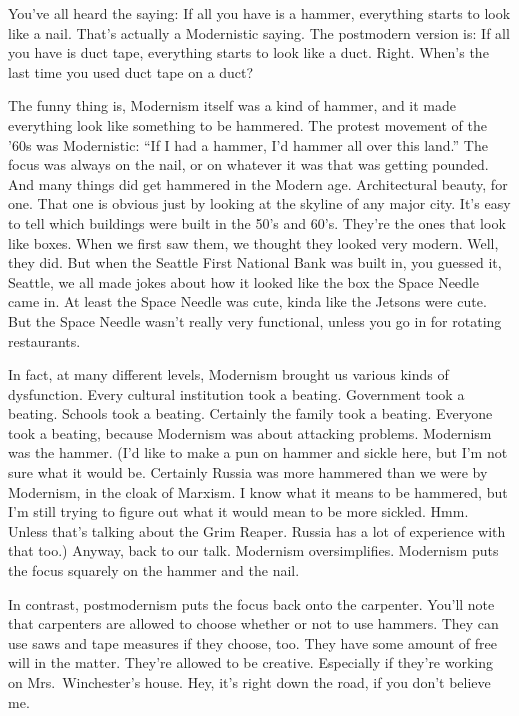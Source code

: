 \documentclass[10pt,letterpaper]{article}
\begin{document}
You've all heard the saying: If all you have is a hammer, everything starts
to look like a nail. That's actually a Modernistic saying. The postmodern
version is: If all you have is duct tape, everything starts to look like a
duct. Right. When's the last time you used duct tape on a duct?

The funny thing is, Modernism itself was a kind of hammer, and it made
everything look like something to be hammered. The protest movement of the '60s
was Modernistic: ``If I had a hammer, I'd hammer all over this land.''
The focus was always on the nail, or on whatever it was that was getting
pounded. And many things did get hammered in the Modern age. Architectural
beauty, for one. That one is obvious just by looking at the skyline of any
major city. It's easy to tell which buildings were built in the 50's and
60's. They're the ones that look like boxes. When we first saw them, we
thought they looked very modern. Well, they did. But when the Seattle First
National Bank was built in, you guessed it, Seattle, we all made jokes about
how it looked like the box the Space Needle came in. At least the Space
Needle was cute, kinda like the Jetsons were cute. But the Space Needle
wasn't really very functional, unless you go in for rotating restaurants.

In fact, at many different levels, Modernism brought us various kinds of
dysfunction. Every cultural institution took a beating. Government took a
beating. Schools took a beating. Certainly the family took a beating.
Everyone took a beating, because Modernism was about attacking problems.
Modernism was the hammer. (I'd like to make a pun on hammer and sickle here,
but I'm not sure what it would be. Certainly Russia was more hammered than we
were by Modernism, in the cloak of Marxism. I know what it means to be
hammered, but I'm still trying to figure out what it would mean to be more
sickled. Hmm. Unless that's talking about the Grim Reaper. Russia has a lot
of experience with that too.) Anyway, back to our talk. Modernism
oversimplifies. Modernism puts the focus squarely on the hammer and the nail.

In contrast, postmodernism puts the focus back onto the carpenter. You'll
note that carpenters are allowed to choose whether or not to use hammers.
They can use saws and tape measures if they choose, too. They have some
amount of free will in the matter. They're allowed to be creative. Especially
if they're working on Mrs.~Winchester's house. Hey, it's right down the road,
if you don't believe me.
\end{document}
